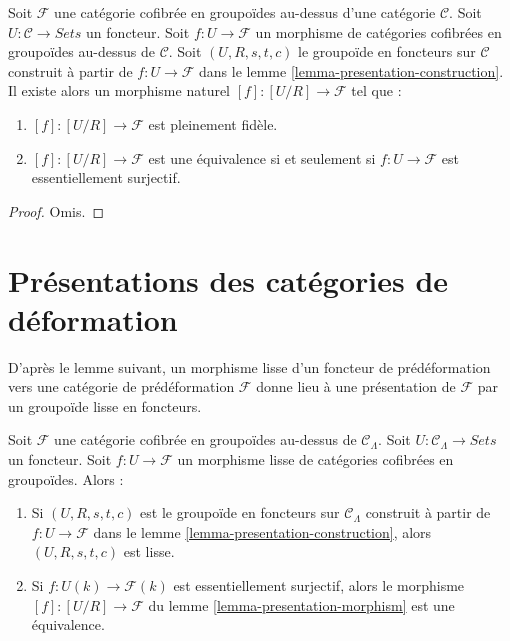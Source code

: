 \begin{lemma}
\label{lemma-presentation-morphism}
Soit $\mathcal{F}$ une catégorie cofibrée en groupoïdes au-dessus d'une
catégorie $\mathcal{C}$. Soit $U : \mathcal{C} \to \textit{Sets}$ un
foncteur. Soit $f : U \to \mathcal{F}$ un morphisme de catégories cofibrées
en groupoïdes au-dessus de $\mathcal{C}$. Soit $(U, R, s, t, c)$ le groupoïde
en foncteurs sur $\mathcal{C}$ construit à partir de
$f : U \to \mathcal{F}$ dans le lemme
\ref{lemma-presentation-construction}. Il existe alors un morphisme naturel
$[f] : [U/R] \to \mathcal{F}$ tel que :
\begin{enumerate}
\item $[f]: [U/R] \to \mathcal{F}$ est pleinement fidèle.
\item $[f]: [U/R] \to \mathcal{F}$ est une équivalence si et seulement si
$f : U \to \mathcal{F}$ est essentiellement surjectif.
\end{enumerate}
\end{lemma}

\begin{proof}
Omis.
\end{proof}







\section{Présentations des catégories de déformation}
\label{section-presentation-deformation-categories}

\noindent
D'après le lemme suivant, un morphisme lisse d'un foncteur de prédéformation
vers une catégorie de prédéformation $\mathcal{F}$ donne lieu à une
présentation de $\mathcal{F}$ par un groupoïde lisse en foncteurs.

\begin{lemma}
\label{lemma-smooth-groupoid-in-functors-construction}
Soit $\mathcal{F}$ une catégorie cofibrée en groupoïdes au-dessus de
$\mathcal{C}_\Lambda$. Soit $U : \mathcal{C}_\Lambda \to \textit{Sets}$ un
foncteur. Soit $f : U \to \mathcal{F}$ un morphisme lisse de catégories
cofibrées en groupoïdes. Alors :
\begin{enumerate}
\item Si $(U, R, s, t, c)$ est le groupoïde en foncteurs sur
$\mathcal{C}_\Lambda$ construit à partir de $f : U \to \mathcal{F}$ dans le
lemme \ref{lemma-presentation-construction}, alors $(U, R, s, t, c)$ est
lisse.
\item Si $f : U(k) \to \mathcal{F}(k)$ est essentiellement surjectif, alors le
morphisme $[f] : [U/R] \to \mathcal{F}$ du lemme
\ref{lemma-presentation-morphism} est une équivalence.
\end{enumerate}
\end{lemma}

